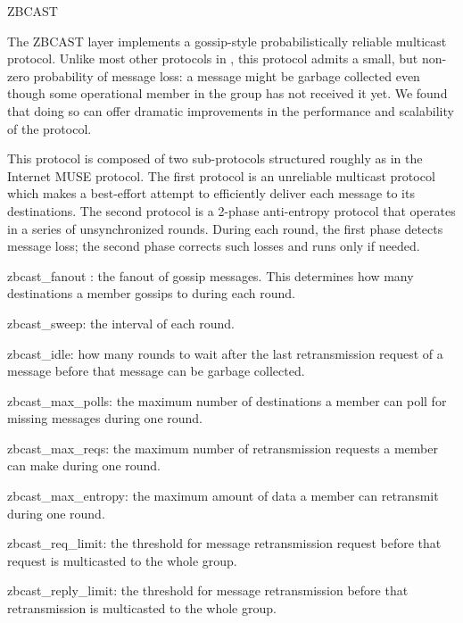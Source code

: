 \begin{Layer}{ZBCAST}

The ZBCAST layer implements a gossip-style probabilistically reliable
multicast protocol.  Unlike most other protocols in \ensemble, this
protocol admits a small, but non-zero probability of message loss: a
message might be garbage collected even though some operational member
in the group has not received it yet.  We found that doing so can
offer dramatic improvements in the performance and scalability of the
protocol.


\begin{Protocol}
This protocol is composed of two sub-protocols structured roughly as in the
Internet MUSE protocol.  The first protocol is an unreliable multicast
protocol which makes a best-effort attempt to efficiently deliver each
message to its destinations.  The second protocol is a 2-phase
anti-entropy protocol that operates in a series of unsynchronized
rounds.  During each round, the first phase detects message loss; the
second phase corrects such losses and runs only if needed.
\end{Protocol}

\begin{Parameters}
\item zbcast\_fanout : the fanout of gossip messages.  This determines
how many destinations a member gossips to during each round.

\item zbcast\_sweep: the interval of each round.

\item zbcast\_idle: how many rounds to wait after the last
retransmission request of a message before that message can be garbage
collected.

\item zbcast\_max\_polls: the maximum number of destinations a member
can poll for missing messages during one round.

\item zbcast\_max\_reqs: the maximum number of retransmission requests
a member can make during one round.

\item zbcast\_max\_entropy: the maximum amount of data a member can
retransmit during one round.

\item zbcast\_req\_limit: the threshold for message retransmission
request before that request is multicasted to the whole group.

\item zbcast\_reply\_limit: the threshold for message retransmission
before that retransmission is multicasted to the whole group.
\end{Parameters}


\end{Layer}
